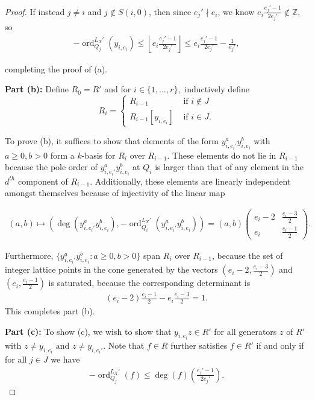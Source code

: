\documentclass{amsart}
\theoremstyle{plain}
\theoremstyle{definition}
\theoremstyle{remark}
\numberwithin{equation}{section}
\newcommand\BZ{{\mathbb Z}}
\DeclareMathOperator{\ord}{ord}
\newcommand \subhalf[1]{\frac{{#1} - 1}{2{#1}}}
\newcommand{\halfcan}{L}
\begin{document}
\begin{proof}
If instead $j\ne i$ and $j \notin S(i,0)$, then since $e_j' \nmid e_i$, we know
$e_i\subhalf{e_j'} \notin \BZ$, so
\begin{align*}
	-\ord_{Q_j}
^{\halfcan_X'}(y_{i, e_i}) \leq \left\lfloor  e_i\subhalf{e_j'} \right\rfloor 
	\leq e_i\subhalf{e_j'} - \frac{1}{e_j'},
\end{align*}

\noindent
completing the proof of (a).

{\bf Part (b):}
Define $R_0 = R'$ and for $i \in \{1, \ldots, r\},$ inductively define 
$$R_i = \begin{cases}
	R_{i - 1} &\text{ if }i \notin J\\
	R_{i - 1}[y_{i, e_i}] &\text{ if }i \in J. 
\end{cases}$$

\noindent
To prove (b), it suffices to show that elements of the form $y_{i, e_
i'}^ay_{i, e_i}^b$ with $a \geq 0, b > 0$ form a $k$-basis for $R_{i}$ over $R_{i-1}$. These elements do not lie in $R_{i - 1}$ because the pole order of $y_{i, e_i'}^ay_{i,e_i}^b$ at $Q_i$ is larger than that of any element in the $d^{th}$ component of $R_{i - 1}$. 
Additionally, these elements are linearly independent amongst themselves because of
injectivity of the linear map

\begin{align*}
	(a,b) \mapsto \left( \deg\left(y_{i, e_i'}^ay_{i, e_i}^b\right),-
	\ord_{Q_i}
^{\halfcan_X'}\left( y_{i, e_i'}^ay_{i, e_i}^b \right)  \right) = (a,b) 
	\begin{pmatrix}
		e_i -2 & \frac{e_i -3}{2} \\
		e_i	 & \frac{e_i - 1}{2}
	\end{pmatrix}.
\end{align*}

\noindent
Furthermore, $\{y_{i, e_i'}^a y_{i, e_i}^b:a \geq 0,
b > 0\}$ span $R_i$ over $R_{i - 1}$, because the set of
integer lattice points in the cone generated by the vectors $\left(e
_i -2, \frac{e_i -3}{2} \right)$ and $\left(e_i, \frac{e_i - 1}{2}
\right)$ is saturated, because the corresponding determinant is
\begin{align*}
	(e_i -2) \frac{e_i - 1}{2} - e_i \frac{e_i -3}{2} = 1.
\end{align*}
This completes part (b).

{\bf Part (c):}
To show (c), we wish to show that $y_{i, e_i}z \in R'$ for all generators $z$ of $R'$
with $z \neq y_{i, e_i} \text{ and } z \neq y_{i, e_i'}$. Note that $f \in R$ further satisfies $f \in R'$ if and
only if for all $j \in J$ we have
\begin{align}
\label{eqn:order-degree}
	-\ord_{Q_j}
^{\halfcan_X'}(f) \leq \deg (f) \left( \subhalf {e_j'} \right).
\end{align}


\end{proof}
\end{document}
